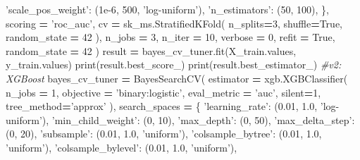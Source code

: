 \documentclass[]{book}
\newenvironment{Shaded}{\begin{snugshade}}{\end{snugshade}}
\newcommand{\DecValTok}[1]{\textcolor[rgb]{0.00,0.00,0.81}{#1}}
\newcommand{\FloatTok}[1]{\textcolor[rgb]{0.00,0.00,0.81}{#1}}
\newcommand{\StringTok}[1]{\textcolor[rgb]{0.31,0.60,0.02}{#1}}
\newcommand{\CommentTok}[1]{\textcolor[rgb]{0.56,0.35,0.01}{\textit{#1}}}
\newcommand{\VariableTok}[1]{\textcolor[rgb]{0.00,0.00,0.00}{#1}}
\newcommand{\OperatorTok}[1]{\textcolor[rgb]{0.81,0.36,0.00}{\textbf{#1}}}
\newcommand{\BuiltInTok}[1]{#1}
\newcommand{\NormalTok}[1]{#1}
\begin{document}
\begin{Shaded}
\begin{Highlighting}[]
        \StringTok{'scale_pos_weight'}\NormalTok{: (}\FloatTok{1e-6}\NormalTok{, }\DecValTok{500}\NormalTok{, }\StringTok{'log-uniform'}\NormalTok{),}
        \StringTok{'n_estimators'}\NormalTok{: (}\DecValTok{50}\NormalTok{, }\DecValTok{100}\NormalTok{),}
\NormalTok{    \},    }
\NormalTok{    scoring }\OperatorTok{=} \StringTok{'roc_auc'}\NormalTok{,}
\NormalTok{    cv }\OperatorTok{=}\NormalTok{ sk_ms.StratifiedKFold(}
\NormalTok{        n_splits}\OperatorTok{=}\DecValTok{3}\NormalTok{,}
\NormalTok{        shuffle}\OperatorTok{=}\VariableTok{True}\NormalTok{,}
\NormalTok{        random_state }\OperatorTok{=} \DecValTok{42}
\NormalTok{    ),}
\NormalTok{    n_jobs }\OperatorTok{=} \DecValTok{3}\NormalTok{,}
\NormalTok{    n_iter }\OperatorTok{=} \DecValTok{10}\NormalTok{,   }
\NormalTok{    verbose }\OperatorTok{=} \DecValTok{0}\NormalTok{,}
\NormalTok{    refit }\OperatorTok{=} \VariableTok{True}\NormalTok{,}
\NormalTok{    random_state }\OperatorTok{=} \DecValTok{42}
\NormalTok{)}
\NormalTok{result }\OperatorTok{=}\NormalTok{ bayes_cv_tuner.fit(X_train.values, y_train.values)}
\BuiltInTok{print}\NormalTok{(result.best_score_)}
\BuiltInTok{print}\NormalTok{(result.best_estimator_)}
\CommentTok{#v2: XGBoost}
\NormalTok{bayes_cv_tuner }\OperatorTok{=}\NormalTok{ BayesSearchCV(}
\NormalTok{    estimator }\OperatorTok{=}\NormalTok{ xgb.XGBClassifier(}
\NormalTok{        n_jobs }\OperatorTok{=} \DecValTok{1}\NormalTok{,}
\NormalTok{        objective }\OperatorTok{=} \StringTok{'binary:logistic'}\NormalTok{,}
\NormalTok{        eval_metric }\OperatorTok{=} \StringTok{'auc'}\NormalTok{,}
\NormalTok{        silent}\OperatorTok{=}\DecValTok{1}\NormalTok{,}
\NormalTok{        tree_method}\OperatorTok{=}\StringTok{'approx'}
\NormalTok{    ),}
\NormalTok{    search_spaces }\OperatorTok{=}\NormalTok{ \{}
        \StringTok{'learning_rate'}\NormalTok{: (}\FloatTok{0.01}\NormalTok{, }\FloatTok{1.0}\NormalTok{, }\StringTok{'log-uniform'}\NormalTok{),}
        \StringTok{'min_child_weight'}\NormalTok{: (}\DecValTok{0}\NormalTok{, }\DecValTok{10}\NormalTok{),}
        \StringTok{'max_depth'}\NormalTok{: (}\DecValTok{0}\NormalTok{, }\DecValTok{50}\NormalTok{),}
        \StringTok{'max_delta_step'}\NormalTok{: (}\DecValTok{0}\NormalTok{, }\DecValTok{20}\NormalTok{),}
        \StringTok{'subsample'}\NormalTok{: (}\FloatTok{0.01}\NormalTok{, }\FloatTok{1.0}\NormalTok{, }\StringTok{'uniform'}\NormalTok{),}
        \StringTok{'colsample_bytree'}\NormalTok{: (}\FloatTok{0.01}\NormalTok{, }\FloatTok{1.0}\NormalTok{, }\StringTok{'uniform'}\NormalTok{),}
        \StringTok{'colsample_bylevel'}\NormalTok{: (}\FloatTok{0.01}\NormalTok{, }\FloatTok{1.0}\NormalTok{, }\StringTok{'uniform'}\NormalTok{),}

\end{Highlighting}
\end{Shaded}
\end{document}
